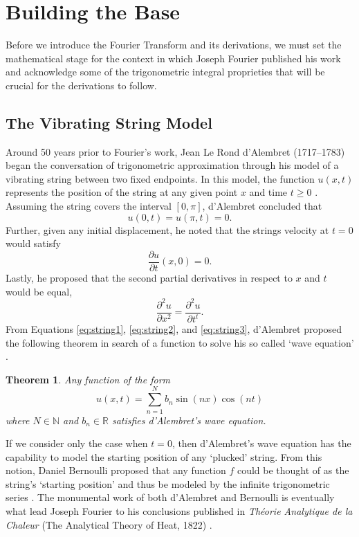 \documentclass[11pt]{amsart}
\theoremstyle{plain}
\newtheorem{theorem}{Theorem}[section]
\theoremstyle{definition}
\newcommand{\N}{\mathbb N}
\newcommand{\R}{\mathbb R}
\begin{document}
\section{Building the Base}
Before we introduce the Fourier Transform and its derivations, we must set the mathematical stage for the context in which Joseph Fourier published his work and acknowledge some of the trigonometric integral proprieties that will be crucial for the derivations to follow. 

\subsection{The Vibrating String Model}
Around 50 years prior to Fourier's work, Jean Le Rond d'Alembret (1717--1783) began the conversation of trigonometric approximation through his model of a vibrating string between two fixed endpoints. In this model, the function $u(x,t)$ represents the position of the string at any given point $x$ and time $t\geq 0$ \cite{Abbott}. Assuming the string covers the interval $[0,\pi]$, d'Alembret concluded that
\begin{equation}\label{eq:string1}
    u(0,t) = u(\pi,t) = 0.
\end{equation}
Further, given any initial displacement, he noted that the strings velocity at $t=0$ would satisfy
\begin{equation}\label{eq:string2}
    \dfrac{\partial u}{\partial t}(x,0) = 0.
\end{equation}
Lastly, he proposed that the second partial derivatives in respect to $x$ and $t$ would be equal, 
\begin{equation} \label{eq:string3}
    \frac{\partial^2 u}{\partial x^2}= \frac{\partial^2 u}{\partial t^t}.
\end{equation}
From Equations \ref{eq:string1}, \ref{eq:string2}, and \ref{eq:string3}, d'Alembret proposed the following theorem in search of a function to solve his so called `wave equation' \cite{Abbott}.

\begin{theorem}
    Any function of the form \[u(x,t)=\sum_{n=1}^N b_n\sin(nx)\cos(nt)\] where $N\in\N$ and $b_n\in \R $ satisfies d'Alembret's wave equation. 
\end{theorem}
If we consider only the case when $t=0$, then d'Alembret's wave equation has the capability to model the starting position of any `plucked' string. From this notion, Daniel Bernoulli proposed that any function $f$ could be thought of as the string's `starting position' and thus be modeled by the infinite trigonometric series \cite{Abbott}. The monumental work of both d'Alembret and Bernoulli is eventually what lead Joseph Fourier to his conclusions published in \textit{Théorie Analytique de la Chaleur} (The Analytical Theory of Heat, 1822) \cite{Fourier}.
\end{document}
